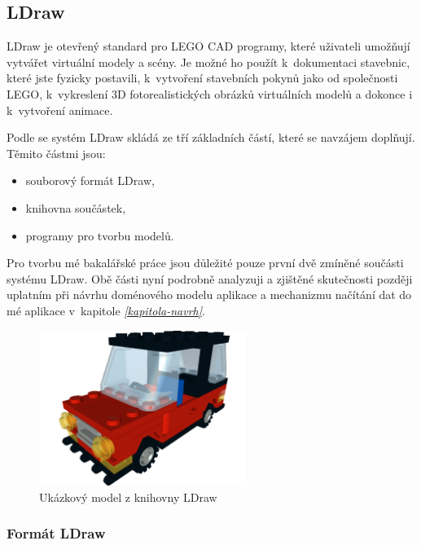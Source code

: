 \subsection{LDraw}\label{reserse-ldraw}  
   
LDraw je otevřený standard pro LEGO \gls{CAD} programy, které uživateli umožňují vytvářet virtuální modely a scény. Je možné ho použít k~dokumentaci stavebnic, které jste fyzicky postavili, k~vytvoření stavebních pokynů jako od společnosti LEGO, k~vykreslení 3D fotorealistických obrázků virtuálních modelů a dokonce i k~vytvoření animace. \autocite{ldraw:homepage}  

Podle \autocite[s.~30]{legobook} se systém LDraw skládá ze tří základních částí, které se navzájem doplňují. Těmito částmi jsou: 

\begin{itemize}
    \item souborový formát LDraw,
    \item knihovna součástek,
    \item programy pro tvorbu modelů. 
\end{itemize}

Pro tvorbu mé bakalářské práce jsou důležité pouze první dvě zmíněné součásti systému LDraw. Obě části nyní podrobně analyzuji a zjištěné skutečnosti později uplatním při návrhu doménového modelu aplikace a mechanizmu načítání dat do mé aplikace v~kapitole \emph{\ref{kapitola-navrh}}.
    
\begin{figure}[htbp]
        \centering
        \includegraphics[width=0.6\textwidth,height=\textheight,keepaspectratio]{images/car.png}
        \caption{Ukázkový model z knihovny LDraw \autocite{ldraw:car}}
\end{figure}

    \subsubsection*{Formát LDraw}\label{ldraw-format}
    

